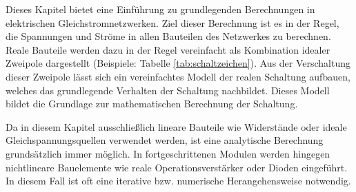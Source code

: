 {	\vspace{10pt}
	
	Dieses Kapitel bietet eine Einführung zu grundlegenden Berechnungen in elektrischen Gleichstromnetzwerken.
	Ziel dieser Berechnung ist es in der Regel, die Spannungen und Ströme in allen Bauteilen des Netzwerkes
	zu berechnen. Reale Bauteile werden dazu in der Regel vereinfacht als Kombination idealer Zweipole dargestellt
	(Beispiele: Tabelle \ref{tab:schaltzeichen}). Aus der Verschaltung dieser 
	Zweipole lässt sich ein vereinfachtes Modell der realen Schaltung aufbauen, welches das grundlegende Verhalten der 
	Schaltung nachbildet.
	Dieses Modell bildet die Grundlage zur mathematischen Berechnung der Schaltung.
	
	
	Da in diesem Kapitel ausschließlich lineare Bauteile wie Widerstände oder ideale Gleichspannungsquellen verwendet werden, ist eine analytische 
	Berechnung grundsätzlich immer möglich. In fortgeschrittenen Modulen werden hingegen nichtlineare Bauelemente
	wie reale Operationsverstärker oder Dioden eingeführt. In diesem Fall ist oft eine iterative bzw. numerische Herangehensweise
	notwendig.
	
	
	
}





